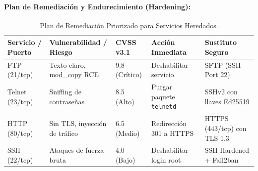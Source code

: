 \documentclass[11pt,letterpaper]{article}
\begin{document}
\paragraph{Plan de Remediación y Endurecimiento (Hardening):}
\begin{table}[H]
    \centering
    \small
    \begin{tabular}{@{}lllll@{}}
        \toprule
        \textbf{Servicio / Puerto} & \textbf{Vulnerabilidad / Riesgo} & \textbf{CVSS v3.1} & \textbf{Acción Inmediata} & \textbf{Sustituto Seguro} \\
        \midrule
        FTP (21/tcp) & Texto claro, mod\_copy RCE & 9.8 (Crítico) & Deshabilitar servicio & SFTP (SSH Port 22) \\
        Telnet (23/tcp) & Sniffing de contraseñas & 8.5 (Alto) & Purgar paquete \texttt{telnetd} & SSHv2 con llaves Ed25519 \\
        HTTP (80/tcp) & Sin TLS, inyección de tráfico & 6.5 (Medio) & Redirección 301 a HTTPS & HTTPS (443/tcp) con TLS 1.3 \\
        SSH (22/tcp) & Ataques de fuerza bruta & 4.0 (Bajo) & Deshabilitar login root & SSH Hardened + Fail2ban \\
        \bottomrule
    \end{tabular}
    \caption{Plan de Remediación Priorizado para Servicios Heredados.}
\end{table}
\end{document}
